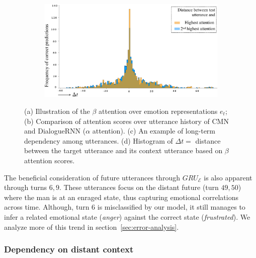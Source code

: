 \documentclass[letterpaper]{article} %
\begin{document}
\begin{figure}[!htbp]
\begin{subfigure}{0.49\textwidth}
	\centering
  \small
	\includegraphics[width=0.7\linewidth]{delta_t_trend_new} 
	\caption{}
	\label{fig:DeltaTTrend}
\end{subfigure}
\caption{(a) Illustration of the $\beta$ attention over emotion representations $e_t$;
  (b) Comparison of attention scores over utterance history of CMN and DialogueRNN ($\alpha$ attention). (c) An example of long-term dependency among utterances. (d) Histogram of $\Delta t=$ distance between the target utterance and its context utterance based on $\beta$ attention scores.}
\end{figure}
The beneficial consideration of future utterances through $GRU_{\mathcal{E}}$ is also apparent through turns $6, 9$. These utterances focus on the distant future (turn $49, 50$) where the man is at an enraged state, thus capturing emotional correlations across time. Although, turn $6$ is misclassified by our model, it still manages to infer a related emotional state (\textit{anger}) against the correct state (\textit{frustrated}). We analyze more of this trend in section~\ref{sec:error-analysis}.

\subsubsection{Dependency on distant context} 

\end{document}
